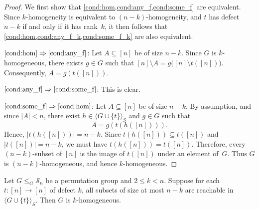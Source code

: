 \begin{proof}	
	We first show that \cref{cond:hom,cond:any_f,cond:some_f} are equivalent.
	Since $k$-homogeneity is equivalent to $(n-k)$-homogeneity, and $t$ has defect~$n-k$
	if and only if it has rank~$k$, it then follows that
	\cref{cond:hom,cond:any_f_k,cond:some_f_k} are also equivalent.
	
	$\ref{cond:hom} \Rightarrow \ref{cond:any_f}$:
	Let $A \subseteq [n]$ be of size $n-k$.
	Since $G$ is $k$-homogeneous, there exists $g \in G$ such that
	$
	[n] \setminus A = g\bigl([n] \setminus t([n])\bigr).
	$
	Consequently,
	$
	A = g(t([n])).
	$
	
	$\ref{cond:any_f} \Rightarrow \ref{cond:some_f}$:
	This is clear.
	
	$\ref{cond:some_f} \Rightarrow \ref{cond:hom}$:
	Let $A \subseteq [n]$ be of size $n-k$.
	By assumption, and since $|A| < n$, there exist
	$h \in \langle G \cup \{t\} \rangle_S$ and $g \in G$ such that
	\[
	A = g(t(h([n]))).
	\]
	Hence,
	$
	|t(h([n]))| = n-k.
	$
	Since $t(h([n])) \subseteq t([n])$ and $|t([n])| = n-k$, we must have
	$
	t(h([n])) = t([n]).
	$
	Therefore, every $(n-k)$-subset of $[n]$ is the image of $t([n])$ under an element
	of~$G$. Thus $G$ is $(n-k)$-homogeneous, and hence $k$-homogeneous.
\end{proof}

\begin{corollary} \label{cor:k_hom_char}
	Let $G \le_G \mathcal S_n$ be a permutation group and $2 \le k < n$.	
	Suppose for each  $t \colon [n] \to [n]$ of defect $k$,
	all subsets of size at most $n - k$ are reachable
	in $\langle G \cup \{t\} \rangle_S$.
	Then $G$ is $k$-homogeneous.
\end{corollary}

